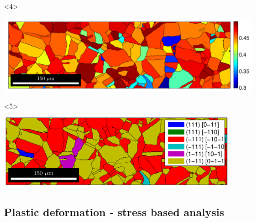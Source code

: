 \documentclass[compress]{beamer}
\begin{document}
\begin{frame}[fragile]
\begin{overlayarea}{\textwidth}{\textheight}
\begin{onlyenv}
\end{onlyenv}
    \begin{onlyenv}<4>
      \centerline{
        \includegraphics[width=\textwidth]{pic/shearStress.pdf}}
    \end{onlyenv}
    \begin{onlyenv}<5> \centerline{
        \includegraphics[width=0.9\textwidth]{pic/slipSystem.pdf}}
    \end{onlyenv}

 \end{overlayarea}
\end{frame}

\subsection*{Plastic deformation - stress based analysis}
\end{document}
